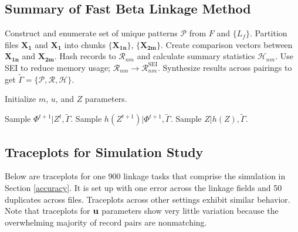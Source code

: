 \documentclass[ba]{imsart}
\begin{document}
\hypertarget{app:fabl-psuedocode}{%
	\subsection{Summary of Fast Beta Linkage Method}\label{app:fabl-psuedocode}}

\begin{algorithm}[h!]
	\begin{algorithmic}[1]
		
		\State Construct and enumerate set of unique patterns $\mathcal{P}$ from $F$ and $\{L_f\}$.
		\State Partition files $\bm{X_1}$ and $\bm{X_1}$ into chunks $\{\bm{X_{1n}}\}$, $\{\bm{X_{2m}}\}$.
		\State Create comparison vectors between $\bm{X_{1n}}$ and $\bm{X_{2m}}$.
		\State Hash records to $\mathcal{R}_{nm}$ and calculate summary statistics $\mathcal{H}_{nm}$.
		\State Use SEI to reduce memory usage; $\mathcal{R}_{nm} \to \mathcal{R}_{nm}^{\text{SEI}}$.
		\EndFor
		\State Synthesize results across pairings to get $\tilde{\Gamma} = \{\mathcal{P}, \mathcal{R}, \mathcal{H} \}$.
		\EndProcedure
		
		\State Initialize $m$, $u$, and $Z$ parameters.
		
		\State Sample $\Phi^{t+1}|Z^{t}, \tilde{\Gamma}$.
		\State Sample $h\left(Z^{t+1}\right)|\Phi^{t+1}, \tilde{\Gamma}$.  
		\EndFor
		\State Sample $Z | h(Z), \tilde{\Gamma}$. 
		
		\EndProcedure
		
	\end{algorithmic}
\end{algorithm}
\clearpage

\hypertarget{appendix-sim}{%
	\subsection{Traceplots for Simulation Study}\label{app:appendix-sim}}
Below are traceplots for one 900 linkage tasks that comprise the simulation in Section \ref{accuracy}. It is set up with one error across the linkage fields and 50 duplicates across files. Traceplots across other settings exhibit similar behavior. Note that traceplots for $\bf{u}$ parameters show very little variation because the overwhelming majority of record pairs are nonmatching.  
\end{document}
